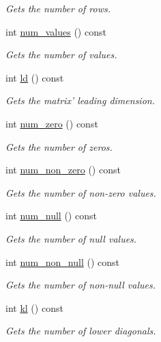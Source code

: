 \begin{DoxyCompactItemize}
\begin{DoxyCompactList}\small\item\em Gets the number of rows. \end{DoxyCompactList}\item 
int \hyperlink{classmtk_1_1Matrix_adbe04990142e2fe76789fa53cfa3d465}{num\-\_\-values} () const 
\begin{DoxyCompactList}\small\item\em Gets the number of values. \end{DoxyCompactList}\item 
int \hyperlink{classmtk_1_1Matrix_acdaa5281bd8f86ea4abf20292d9fd20f}{ld} () const 
\begin{DoxyCompactList}\small\item\em Gets the matrix' leading dimension. \end{DoxyCompactList}\item 
int \hyperlink{classmtk_1_1Matrix_a78e1f8449a21db53750e083c6802a993}{num\-\_\-zero} () const 
\begin{DoxyCompactList}\small\item\em Gets the number of zeros. \end{DoxyCompactList}\item 
int \hyperlink{classmtk_1_1Matrix_a221ba0082ef5191175db743d13388521}{num\-\_\-non\-\_\-zero} () const 
\begin{DoxyCompactList}\small\item\em Gets the number of non-\/zero values. \end{DoxyCompactList}\item 
int \hyperlink{classmtk_1_1Matrix_a5bf58512ee91d6ab80eb94541072a9cf}{num\-\_\-null} () const 
\begin{DoxyCompactList}\small\item\em Gets the number of null values. \end{DoxyCompactList}\item 
int \hyperlink{classmtk_1_1Matrix_ae81eaf61b6633ccd054c96344aa82a48}{num\-\_\-non\-\_\-null} () const 
\begin{DoxyCompactList}\small\item\em Gets the number of non-\/null values. \end{DoxyCompactList}\item 
int \hyperlink{classmtk_1_1Matrix_ae271cb0b61c1ef04d57319d46db90ebf}{kl} () const 
\begin{DoxyCompactList}\small\item\em Gets the number of lower diagonals. \end{DoxyCompactList}\item 

\end{DoxyCompactItemize}

